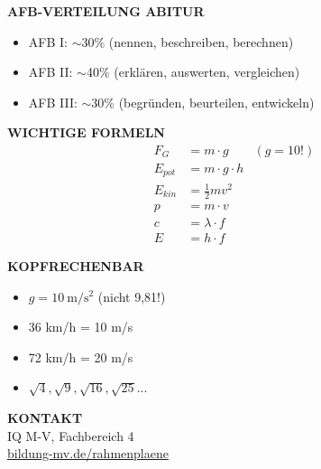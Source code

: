 \documentclass[11pt,a4paper]{article}
\begin{document}
\begin{minipage}[t]{0.48\textwidth}
\textbf{\color{physikblue}AFB-VERTEILUNG ABITUR}
\begin{itemize}[leftmargin=0.3cm, itemsep=1pt, topsep=2pt]
\item AFB I: $\sim$30\% (nennen, beschreiben, berechnen)
\item AFB II: $\sim$40\% (erklären, auswerten, vergleichen)
\item AFB III: $\sim$30\% (begründen, beurteilen, entwickeln)
\end{itemize}

\vspace{0.2cm}
\textbf{\color{physikblue}WICHTIGE FORMELN}
\begin{align*}
F_G &= m \cdot g & (g = 10!) \\
E_{pot} &= m \cdot g \cdot h \\
E_{kin} &= \tfrac{1}{2} m v^2 \\
p &= m \cdot v \\
c &= \lambda \cdot f \\
E &= h \cdot f
\end{align*}

\vspace{0.2cm}
\textbf{\color{physikblue}KOPFRECHENBAR}
\begin{itemize}[leftmargin=0.3cm, itemsep=1pt, topsep=2pt]
\item $g = \SI{10}{\metre\per\second\squared}$ (nicht 9,81!)
\item 36 km/h = 10 m/s
\item 72 km/h = 20 m/s
\item $\sqrt{4}, \sqrt{9}, \sqrt{16}, \sqrt{25}...$
\end{itemize}

\vspace{0.2cm}
\textbf{\color{physikblue}KONTAKT}\\
IQ M-V, Fachbereich 4\\
\url{bildung-mv.de/rahmenplaene}
\end{minipage}

\vspace{0.5cm}
\begin{center}
\end{center}
\end{document}
